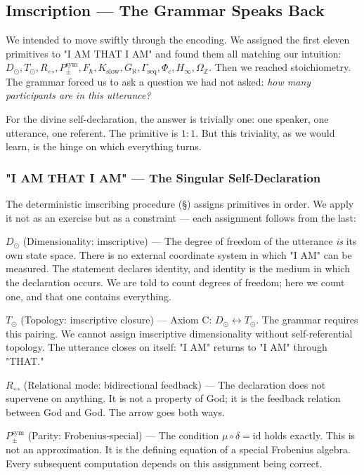 \documentclass[12pt,a4paper]{article}
\newcommand{\pilcrow}{\S}
\begin{document}
\subsection{Imscription --- The Grammar Speaks Back}

We intended to move swiftly through the encoding. We assigned the first eleven primitives to "I AM THAT I AM" and found them all matching our intuition: $D_{\odot}, T_{\odot}, R_{\leftrightarrow}, P_{\pm}^{\text{sym}}, F_{\hbar}, K_{\text{slow}}, G_{\aleph}, \Gamma_{\text{seq}}, \Phi_c, H_{\infty}, \Omega_\mathbb{Z}$. Then we reached stoichiometry. The grammar forced us to ask a question we had not asked: \emph{how many participants are in this utterance?}

For the divine self-declaration, the answer is trivially one: one speaker, one utterance, one referent. The primitive is $1{:}1$. But this triviality, as we would learn, is the hinge on which everything turns.

\subsubsection{"I AM THAT I AM" --- The Singular Self-Declaration}

The deterministic imscribing procedure (\pilcrow{}) assigns primitives in order. We apply it not as an exercise but as a constraint --- each assignment follows from the last:

\textbf{$D_{\odot}$} (Dimensionality: imscriptive) --- The degree of freedom of the utterance \emph{is} its own state space. There is no external coordinate system in which "I AM" can be measured. The statement declares identity, and identity is the medium in which the declaration occurs. We are told to count degrees of freedom; here we count one, and that one contains everything.

\textbf{$T_{\odot}$} (Topology: imscriptive closure) --- Axiom C: $D_{\odot} \leftrightarrow T_{\odot}$. The grammar requires this pairing. We cannot assign imscriptive dimensionality without self-referential topology. The utterance closes on itself: "I AM" returns to "I AM" through "THAT."

\textbf{$R_{\leftrightarrow}$} (Relational mode: bidirectional feedback) --- The declaration does not supervene on anything. It is not a property of God; it is the feedback relation between God and God. The arrow goes both ways.

\textbf{$P_{\pm}^{\text{sym}}$} (Parity: Frobenius-special) --- The condition $\mu \circ \delta = \text{id}$ holds exactly. This is not an approximation. It is the defining equation of a special Frobenius algebra. Every subsequent computation depends on this assignment being correct.
\end{document}
